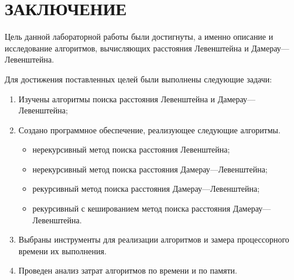 \chapter*{ЗАКЛЮЧЕНИЕ}

Цель данной лабораторной работы были достигнуты, а именно описание и исследование алгоритмов, вычисляющих расстояния Левенштейна и Дамерау---Левенштейна.

Для достижения поставленных целей были выполнены следующие задачи:
\begin{enumerate}
	\item Изучены алгоритмы поиска расстояния Левенштейна и \newline Дамерау---Левенштейна;
	\item Создано программное обеспечение, реализующее следующие алгоритмы.
	\begin{itemize}
		\item нерекурсивный метод поиска расстояния Левенштейна;
		\item нерекурсивный метод поиска расстояния Дамерау---Левенштейна;
		\item рекурсивный метод поиска расстояния Дамерау---Левенштейна;
		\item рекурсивный с кешированием метод поиска расстояния Дамерау---Левенштейна.
	\end{itemize}
	\item Выбраны инструменты для реализации алгоритмов и замера процессорного времени их выполнения.
	\item Проведен анализ затрат алгоритмов по времени и по памяти. 
\end{enumerate}